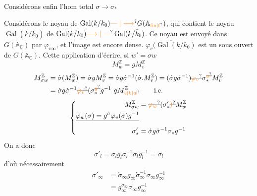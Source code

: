  Considérons enfin l'hom total $\sigma\longrightarrow\sigma_*$

 Considérons le noyau de $\operatorname{Gal}(k/k_0)\unsure{\mathrel{\text{---}}|\longrightarrow}G(\mathbb A_{\unsure{\mathrm{fin}|\mathrm f}})$, qui contient le noyau $\operatorname{Gal}(k/\bar k_0)$ de $\operatorname{Gal}(k/k_0)\unsure{\longrightarrow|\mathrel{\text{---}}}\operatorname{Gal}(k/\bar k_0)$. Ce noyau est envoyé dans $G(\mathbb A_{\mathbb C})$ par $\varphi_{v\infty}$, et l'image est encore dense.
    $\overline{\varphi_v(\operatorname{Gal}(k/k_0)}$ est un sous  ouvert de $G(\mathbb A_{\mathbb C})$.
Cette application  d'écrire, si $w'=\sigma w$
\[
M_w^{\mathbb Z}=gM_v^{\mathbb Z}
\]
\[
\begin{aligned}
M_{\sigma w}^{\mathbb Z}&=\dot{\sigma}(M_w^{\mathbb Z})=\dot{\sigma}gM_v^{\mathbb Z}
=\dot{\sigma}g\dot{\sigma}^{-1}(\dot{\sigma}.M_v^{\mathbb Z})
=(\dot{\sigma}g\dot{\sigma}^{-1})\deleted{\unsure{\varphi_v}}\sigma_*^{\deleted{\unsure{g}}}M_v^{\mathbb Z}\\
&=\dot{\sigma}g\dot{\sigma}^{-1}\deleted{\unsure{\varphi_v}}(\sigma_*^{\deleted{\unsure{g}}}g^{-1}\ gM_{\unsure{v|k|w}}^{\mathbb Z}\qquad\text{i.e.}
\end{aligned}
\]
\[
\left\{\begin{aligned}
M_{\sigma w}^{\mathbb Z}&=\deleted{\unsure{\varphi_w}}(\sigma'_* \deleted{\unsure{)}}M_w^{\mathbb Z}\\
\deleted{\varphi_w(\sigma)=g^{\dot{\sigma}}\varphi_v(\sigma)g^{-1}}&\\
\sigma'_*&=\dot{\sigma}g\dot{\sigma}^{-1}\sigma_*g^{-1}
\end{aligned}\right.
\]
On a donc 
\[
\sigma'_l=\sigma_l g_l\sigma_l^{-1}\sigma_l g_l^{-1}=\sigma_l
\]
d'où nécessairement
\[
\begin{aligned}
\sigma'_\infty&=\dot{\sigma}_\infty g_\infty\dot{\sigma}_\infty^{-1}\sigma_\infty g_\infty^{-1}\\
&=g_\infty^{\dot{\sigma}_\infty}\sigma_\infty g_\infty^{-1}
\end{aligned}
\]
